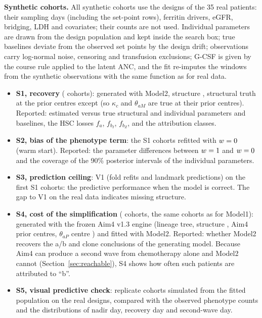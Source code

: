 \documentclass[11pt]{article}
\begin{document}
\textbf{Synthetic cohorts.} All synthetic cohorts use the designs of the 35 real patients: their sampling days (including the set-point rows), ferritin drivers, eGFR, bridging, LDH and covariates; their counts are not used. Individual parameters are drawn from the design population and kept inside the search box; true baselines deviate from the observed set points by the design drift; observations carry log-normal noise, censoring and transfusion exclusions; G-CSF is given by the course rule applied to the latent ANC, and the fit re-imputes the windows from the synthetic observations with the same function as for real data.
\begin{itemize}
\item \textbf{S1, recovery} (\valSone{} cohorts): generated with Model2, structure \texttt{\valSoneModel}, structural truth at the prior centres except \valSoneTruth{} (so $\kappa_c$ and $\theta_{aM}$ are true at their prior centres). Reported: estimated versus true structural and individual parameters and baselines, the HSC losses $f_a$, $f_{b_I}$, $f_{b_Z}$, and the attribution classes.
\item \textbf{S2, bias of the phenotype term}: the S1 cohorts refitted with $w=0$ (warm start). Reported: the parameter differences between $w=1$ and $w=0$ and the coverage of the 90\% posterior intervals of the individual parameters.
\item \textbf{S3, prediction ceiling}: V1 (fold refits and landmark predictions) on the first \valSthree{} S1 cohorts: the predictive performance when the model is correct. The gap to V1 on the real data indicates missing structure.
\item \textbf{S4, cost of the simplification} (\valSfour{} cohorts, the same cohorts as for Model1): generated with the frozen Aim4 v1.3 engine (lineage tree, structure \texttt{\valSfourModel}, Aim4 prior centres, $\theta_{aP}$ centre \valThapAimFour) and fitted with Model2. Reported: whether Model2 recovers the a/b and clone conclusions of the generating model. Because Aim4 can produce a second wave from chemotherapy alone and Model2 cannot (Section~\ref{sec:reachable}), S4 shows how often such patients are attributed to ``b''.
\item \textbf{S5, visual predictive check}: \valSfive{} replicate cohorts simulated from the fitted population on the real designs, compared with the observed phenotype counts and the distributions of nadir day, recovery day and second-wave day.
\end{itemize}
\end{document}
